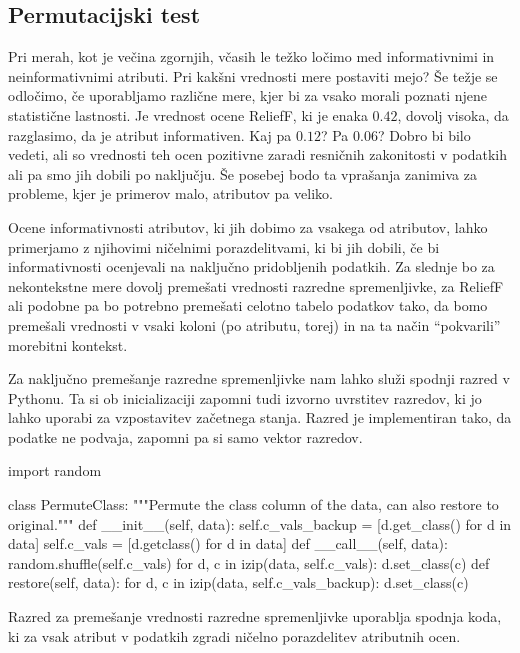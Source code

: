 \subsection{Permutacijski test}

Pri merah, kot je večina zgornjih, včasih le težko ločimo med informativnimi in neinformativnimi atributi. Pri kakšni vrednosti mere postaviti mejo? Še težje se odločimo, če uporabljamo različne mere, kjer bi za vsako morali poznati njene statistične lastnosti. Je vrednost ocene ReliefF, ki je enaka $0.42$, dovolj visoka, da razglasimo, da je atribut informativen. Kaj pa $0.12$? Pa $0.06$? Dobro bi bilo vedeti, ali so vrednosti teh ocen pozitivne zaradi resničnih zakonitosti v podatkih ali pa smo jih dobili po naključju. Še posebej bodo ta vprašanja zanimiva za probleme, kjer je primerov malo, atributov pa veliko. 

Ocene informativnosti atributov, ki jih dobimo za vsakega od atributov, lahko primerjamo z njihovimi ničelnimi porazdelitvami, ki bi jih dobili, če bi informativnosti ocenjevali na naključno pridobljenih podatkih. Za slednje bo za nekontekstne mere dovolj premešati vrednosti razredne spremenljivke, za ReliefF ali podobne pa bo potrebno premešati celotno tabelo podatkov tako, da bomo premešali vrednosti v vsaki koloni (po atributu, torej) in na ta način ``pokvarili'' morebitni kontekst.

Za naključno premešanje razredne spremenljivke nam lahko služi spodnji razred v Pythonu. Ta si ob inicializaciji zapomni tudi izvorno uvrstitev razredov, ki jo lahko uporabi za vzpostavitev začetnega stanja. Razred je implementiran tako, da podatke ne podvaja, zapomni pa si samo vektor razredov.

\begin{python}
import random

class PermuteClass:
    """Permute the class column of the data, can also restore to original."""
    def __init__(self, data):
        self.c_vals_backup = [d.get_class() for d in data]
        self.c_vals = [d.getclass() for d in data]
    def __call__(self, data):
        random.shuffle(self.c_vals)
        for d, c in izip(data, self.c_vals):
            d.set_class(c)
    def restore(self, data):
        for d, c in izip(data, self.c_vals_backup):
            d.set_class(c)
\end{python}

Razred za premešanje vrednosti razredne spremenljivke uporablja spodnja koda, ki za vsak atribut v podatkih zgradi ničelno porazdelitev atributnih ocen.


